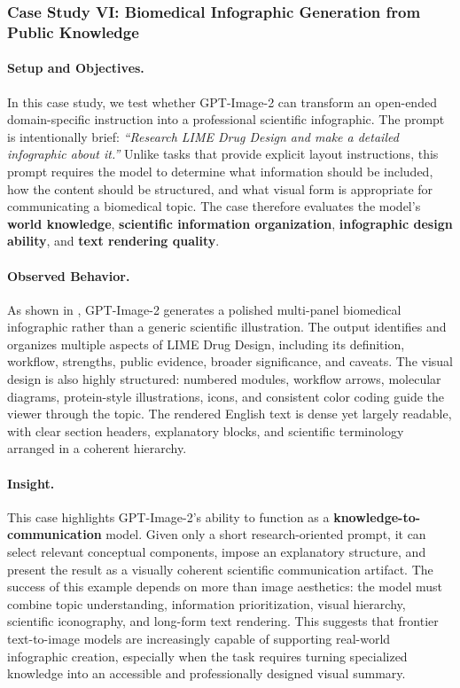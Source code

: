 \documentclass{llmxive}
\begin{document}
\subsubsection{Case Study VI: Biomedical Infographic Generation from Public Knowledge}

\paragraph{Setup and Objectives.}
In this case study, we test whether GPT-Image-2 can transform an open-ended domain-specific instruction into a professional scientific infographic. The prompt is intentionally brief: \emph{``Research LIME Drug Design and make a detailed infographic about it.''} Unlike tasks that provide explicit layout instructions, this prompt requires the model to determine what information should be included, how the content should be structured, and what visual form is appropriate for communicating a biomedical topic. The case therefore evaluates the model's \textbf{world knowledge}, \textbf{scientific information organization}, \textbf{infographic design ability}, and \textbf{text rendering quality}.

\paragraph{Observed Behavior.}
As shown in , GPT-Image-2 generates a polished multi-panel biomedical infographic rather than a generic scientific illustration. The output identifies and organizes multiple aspects of LIME Drug Design, including its definition, workflow, strengths, public evidence, broader significance, and caveats. The visual design is also highly structured: numbered modules, workflow arrows, molecular diagrams, protein-style illustrations, icons, and consistent color coding guide the viewer through the topic. The rendered English text is dense yet largely readable, with clear section headers, explanatory blocks, and scientific terminology arranged in a coherent hierarchy.

\paragraph{Insight.}
This case highlights GPT-Image-2's ability to function as a \textbf{knowledge-to-communication} model. Given only a short research-oriented prompt, it can select relevant conceptual components, impose an explanatory structure, and present the result as a visually coherent scientific communication artifact. The success of this example depends on more than image aesthetics: the model must combine topic understanding, information prioritization, visual hierarchy, scientific iconography, and long-form text rendering. This suggests that frontier text-to-image models are increasingly capable of supporting real-world infographic creation, especially when the task requires turning specialized knowledge into an accessible and professionally designed visual summary.
\end{document}
